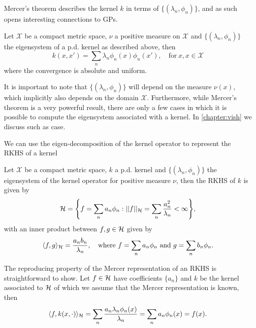 Mercer's theorem describes the kernel $k$ in terms of $\{(\lambda_n, \phi_n)\}$, and as such opens interesting connections to GPs.
\begin{theorem}[Mercer]
  Let $\mathcal{X}$ be a compact metric space, $\nu$ a positive measure on $\mathcal{X}$ and $\{(\lambda_n, \phi_n)\}$ the eigensystem of a p.d. kernel as described above, then
\begin{equation}
  k(x,x')  = \sum_n \lambda_n \phi_n(x) \phi_n(x'),\quad\text{for}\ x,x\in \mathcal{X}
\end{equation}
where the convergence is absolute and uniform.
\end{theorem}
It is important to note that $\{(\lambda_n, \phi_n)\}$ will depend on the measure $\nu(x)$, which implicitly also depends on the domain $\mathcal{X}$. Furthermore, while Mercer's theorem is a very powerful result, there are only a few cases in which it is possible to compute the eigensystem associated with a kernel. In \cref{chapter:vish} we discuss such as case.

We can use the eigen-decomposition of the kernel operator to represent the RKHS of a kernel
\begin{theorem}
  Let $\mathcal{X}$ be a compact metric space, $k$ a p.d. kernel and $\{(\lambda_n, \phi_n)\}$ the eigensystem of the kernel operator for positive measure $\nu$, then the RKHS of $k$ is given by
\begin{equation}
    \label{eq:mercer-rkhs}
    \rkhs = \left\{
    f = \sum_n a_n \phi_{n}:
    \norm{f}_{\rkhs} = \sum_n \frac{a_n^2}{\lambda_n} < \infty
    \right\},
\end{equation}
with an inner product between $f,g \in {\mathcal{H}}$ given by
\begin{equation}
  \langle f, g \rangle_{{\mathcal{H}}} = \frac{a_n b_n}{\lambda_n},\quad\text{where}\ f = \sum_n a_n \phi_n\ \text{and}\ g = \sum_n b_n \phi_n.
\end{equation}
\end{theorem}
The reproducing property of the Mercer representation of an RKHS is straightforward to show. Let $f \in {\mathcal{H}}$ have coefficients $\{a_n\}$ and $k$ be the kernel associated to ${\mathcal{H}}$ of which we assume that the Mercer representation is known, then
\begin{equation}
  \langle f, k(x, \cdot) \rangle_{{\mathcal{H}}} = \sum_n \frac{a_n \lambda_n \phi_n(x)}{\lambda_n} = \sum_n a_n \phi_n(x) = f(x).
\end{equation}

